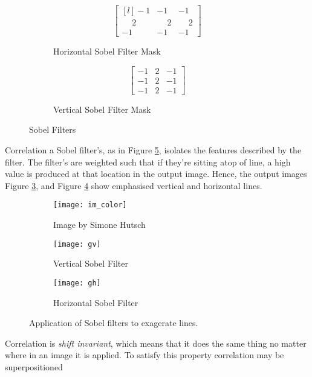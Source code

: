 \begin{figure}[H]
  \begin{subfigure}[b]{0.49\textwidth}
    \[
    \begin{bmatrix*}[l]
     -1 & -1 & -1 \\
      \phantom{-}2 & \phantom{-}2 & \phantom{-}2 \\
      -1 & -1 & -1 
    \end{bmatrix*}
    \]
    \caption{Horizontal Sobel Filter Mask}
    \label{rfidtest_xaxis}
\end{subfigure}
\begin{subfigure}[b]{0.49\textwidth}
  \[ 
    \begin{bmatrix}
      -1 & 2 & -1 \\
      -1 & 2 & -1 \\
      -1 & 2 & -1
    \end{bmatrix}
    \]
    \caption{Vertical Sobel Filter Mask}  
\end{subfigure}
    \caption{Sobel Filters}
    \label{fig:sobel_filters}
\end{figure}

Correlation a Sobel filter's, as in Figure \ref{fig:sobel_apply}, isolates the features described by the filter. The filter's are weighted such that if they're sitting atop of line, a high value is produced at that location in the output image. Hence, the output images Figure \ref{fig:vert}, and Figure \ref{fig:hoz} show emphasised vertical and horizontal lines.

\begin{figure}[htbp]
  \centering
  \begin{subfigure}[b]{0.3\textwidth}
      \texttt{[image: im\_color]}
      \caption{Image by Simone Hutsch}
  \end{subfigure}
  \begin{subfigure}[b]{0.3\textwidth}
      \texttt{[image: gv]}
      \caption{Vertical Sobel Filter}
      \label{fig:vert}
  \end{subfigure}
  \begin{subfigure}[b]{0.3\textwidth}
      \texttt{[image: gh]}
      \caption{Horizontal Sobel Filter}
      \label{fig:hoz}
  \end{subfigure}
  \caption{Application of Sobel filters to exagerate lines.}
  \label{fig:sobel_apply}
\end{figure}

Correlation is \emph{shift invariant}, which means that it does the same thing no matter where in an image it is applied. To satisfy this property correlation may be superpositioned 

